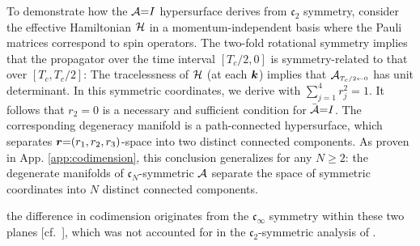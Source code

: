 \documentclass[aps, prb, showpacs, twocolumn, notitlepage, superscriptaddress]{revtex4-1}
\begin{document}
To demonstrate how the ${\cal A}{=}I$ hypersurface derives from $\mathfrak{c}_2$ symmetry, consider  the effective Hamiltonian ${\cal H}$ 
in a momentum-independent basis where the Pauli matrices correspond to spin operators. The two-fold rotational symmetry 
implies that the propagator over the time interval $[T_c/2,0]$ is symmetry-related to that over $[T_c,T_c/2]$:
The tracelessness of ${\cal H}$ (at each $\boldsymbol{k}$) implies that  ${{\cal A}}_{\scriptscriptstyle{T_c/2\leftarrow 0}}$  has unit determinant.  In this symmetric coordinates, we derive 
with $\sum_{j=1}^4r_j^2{=}1$. It follows that $r_2{=}0$ is a necessary and sufficient condition for $\bar{{\cal A}}{=}I$. The corresponding degeneracy manifold is a path-connected hypersurface, which separates $\boldsymbol{r}{=}(r_1,r_2,r_3)$-space into two distinct connected components. As proven in App. \ref{app:codimension}, this conclusion generalizes for any $N{\geq}2$: the degenerate manifolds of $\mathfrak{c}_N$-symmetric ${\cal A}$ separate the space of symmetric coordinates into $N$ distinct connected components.

 the difference in codimension originates from the $\mathfrak{c}_{\infty}$ symmetry within these two planes [cf.\ ], which was not accounted for in the $\mathfrak{c}_2$-symmetric analysis of .
\end{document}
